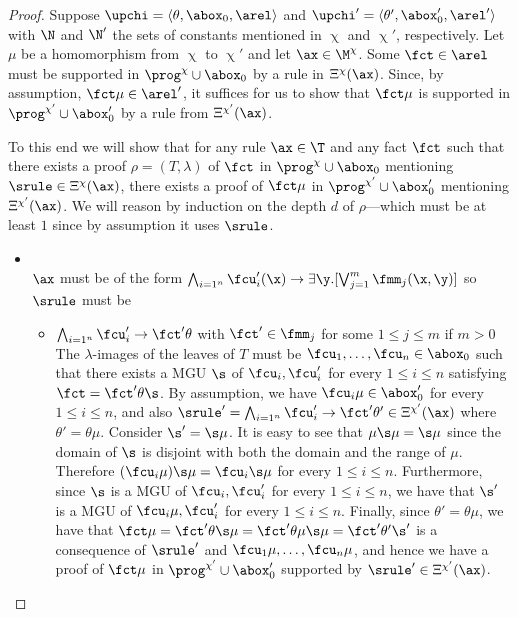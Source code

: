 \begin{proof}
Suppose $\upchi = \langle \theta, \abox_0, \arel \rangle$ and $\upchi' = \langle\theta', \abox_0', \arel' \rangle$ 
with $\N$  and $\N'$ the sets of constants mentioned in $\upchi$  and $\upchi'$, respectively.
Let $\mu$ be a homomorphism from $\upchi$ to $\upchi'$ and let $\ax\in\M^{\chi}$. 
Some $\fct\in\arel$ %
must be supported  in $\prog^{\chi}\cup\abox_0$ by a rule in $\Xi^{\chi}(\ax)$. 
Since, by assumption, $\fct\mu\in\arel'$, it suffices for us to show that
$\fct\mu$ is supported in $\prog^{\chi'}\cup\abox'_0$ by a rule from $\Xi^{\chi'}(\ax)$.


To this end we will show that for any rule $\ax\in\T$ and any fact $\fct$ such that there exists a proof 
$\rho = (T,\lambda)$ of $\fct$ in $\prog^{\chi}\cup\abox_0$ mentioning $\srule\in\Xi^{\chi}(\ax)$, 
there exists a proof of $\fct\mu$ in $\prog^{\chi'}\cup\abox'_0$ mentioning $\Xi^{\chi'}(\ax)$.
We will reason by induction on the depth $d$ of $\rho$---which must be at least $1$ since by assumption it uses $\srule$.

\begin{itemize}
\item [$d=1$] \ \\
$\ax$ must be of the form $\bigwedge_{i=1^n}\fcu'_i(\x) \to \exists \y. [\bigvee_{j=1}^m \fmm_j(\x,\y)]$
so $\srule$ must be 
	\begin{itemize}
	\item $\bigwedge_{i=1^n}\fcu'_i \to \fct'\theta$ with $\fct'\in\fmm_j$ for some $1\leq j \leq m$ if $m>0$ \\
          The $\lambda$-images of the leaves of $T$ must be
          $\fcu_1,\dots,\fcu_n \in \abox_0$ such that there exists a
          MGU $\s$ of $\fcu_i, \fcu'_i$ for every $1\leq i \leq n$
          satisfying $\fct = \fct'\theta\s$.
	By assumption, we have $\fcu_i\mu\in\abox'_0$ for every $1\leq i \leq n$, and also
	$\srule' = \bigwedge_{i=1^n}\fcu'_i \to \fct'\theta' \in \Xi^{\chi'}(\ax)$ where $\theta'=\theta\mu$.
	Consider $\s' = \s\mu$. 
	It is easy to see that $\mu\s\mu = \s\mu$ since the domain of $\s$ is disjoint with both the domain and 
	the range of $\mu$. Therefore $(\fcu_i\mu)\s\mu = \fcu_i\s\mu$ for every $1\leq i \leq n$.
	Furthermore, since $\s$ is a MGU of $\fcu_i, \fcu'_i$ for every $1\leq i \leq n$, we have that 
	$\s'$ is a MGU of $\fcu_i\mu, \fcu'_i$ for every $1\leq i \leq n$.
	Finally, since $\theta' = \theta\mu$, we have that 
	$\fct\mu = \fct'\theta\s\mu = \fct'\theta\mu\s\mu = \fct'\theta'\s'$ is a consequence of
	$\srule'$ and $\fcu_1\mu, \dots, \fcu_n\mu$, and hence we have a proof of 
	$\fct\mu$ in $\prog^{\chi'}\cup\abox_0'$ 
	supported by $\srule'\in\Xi^{\chi'}(\ax)$.
	

\end{itemize}
\end{itemize}
\end{proof}
